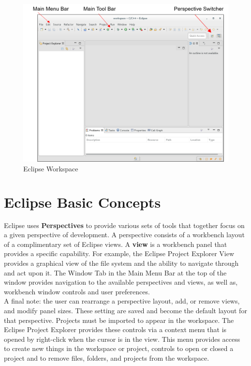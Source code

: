\documentclass[10pt, a4paper, oneside]{article}
\begin{document}
\begin{figure}[h!]
	\centering
	\caption{Eclipse Workspace}{}
	\includegraphics[width=\textwidth]{EclipseWorkspace.png}
 \end{figure}

\section{Eclipse Basic Concepts}
Eclipse uses \textbf{Perspectives} to provide various sets of tools that together focus on a given perspective of development. A perspective consists of a workbench layout of a complimentary set of Eclipse views. A \textbf{view} is a workbench panel that provides a specific capability. For example, the Eclipse Project Explorer View provides a graphical view of the file system and the ability to navigate through and act upon it. The Window Tab in the Main Menu Bar at the top of the window provides navigation to the available perspectives and views, as well as, workbench window controls and user preferences. \\

A final note: the user can rearrange a perspective layout, add, or remove views, and modify panel sizes. These setting are saved and become the default layout for that perspective. Projects must be imported to appear in the workspace. The Eclipse Project Explorer provides these controls via a context menu that is opened by right-click when the cursor is in the view. This menu provides access to create new things in the workspace or project, controls to open or closed a project and to remove files, folders, and projects from the workspace.\\
\end{document}
